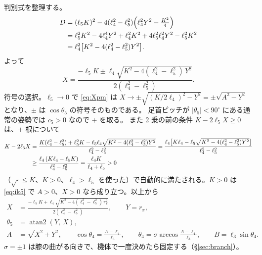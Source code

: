 \documentclass[a4paper,11pt]{ltjsarticle}
\newcommand{\cs}[1]{c_{#1}}\newcommand{\sn}[1]{s_{#1}}
\begin{document}
判別式を整理する。
\begin{align}
D&=(\ell_5K)^2-4(\ell_4^2-\ell_5^2)\Bigl(\ell_4^2Y^2-\tfrac{K^2}{4}\Bigr)\notag\\
&=\ell_5^2K^2-4\ell_4^4Y^2+\ell_4^2K^2+4\ell_5^2\ell_4^2Y^2-\ell_5^2K^2\notag\\
&=\ell_4^2\bigl[K^2-4(\ell_4^2-\ell_5^2)Y^2\bigr].
\end{align}
よって
\begin{equation}
X=\frac{-\ell_5K\pm \ell_4\sqrt{K^2-4(\ell_4^2-\ell_5^2)\,Y^2}}{2(\ell_4^2-\ell_5^2)}.
\label{eq:Xpm}
\end{equation}
符号の選択。$\ell_5\to0$ で \eqref{eq:Xpm} は $X\to\pm\sqrt{(K/2\ell_4)^2-Y^2}=\pm\sqrt{A^2-Y^2}$ となり、$\pm$ は $\cos\theta_5$ の符号そのものである。
足首ピッチが $|\theta_5|<90^\circ$ にある通常の姿勢では $\cs5>0$ なので $+$ を取る。
また 2 乗の前の条件 $K-2\ell_5X\ge0$ は、$+$ 根について
\begin{align}
K-2\ell_5X&=\frac{K(\ell_4^2-\ell_5^2)+\ell_5^2K-\ell_5\ell_4\sqrt{K^2-4(\ell_4^2-\ell_5^2)Y^2}}{\ell_4^2-\ell_5^2}
=\frac{\ell_4\bigl[K\ell_4-\ell_5\sqrt{K^2-4(\ell_4^2-\ell_5^2)Y^2}\bigr]}{\ell_4^2-\ell_5^2}\notag\\
&\ge\frac{\ell_4\,(K\ell_4-\ell_5K)}{\ell_4^2-\ell_5^2}=\frac{\ell_4K}{\ell_4+\ell_5}>0
\end{align}
（$\sqrt{\cdot}\le K$、$K>0$、$\ell_4>\ell_5$ を使った）で自動的に満たされる。$K>0$ は \eqref{eq:ik5} で $A>0$、$X>0$ なら成り立つ。以上から
\begin{align}
X&=\frac{-\ell_5K+\ell_4\sqrt{K^2-4(\ell_4^2-\ell_5^2)\,r_x^2}}{2(\ell_4^2-\ell_5^2)},\qquad Y=r_x, \tag{IK-7$'$}\label{eq:ik7d}\\
\theta_5&=\operatorname{atan2}(Y,\,X), \tag{IK-8}\label{eq:ik8}\\
A&=\sqrt{X^2+Y^2},\qquad \cos\theta_4=\frac{A-\ell_4}{\ell_3},\qquad \theta_4=\sigma\arccos\frac{A-\ell_4}{\ell_3},\qquad B=\ell_3\sin\theta_4. \tag{IK-9}\label{eq:ik9}
\end{align}
$\sigma=\pm1$ は膝の曲がる向きで、機体で一度決めたら固定する（\S\ref{sec:branch}）。
\end{document}
